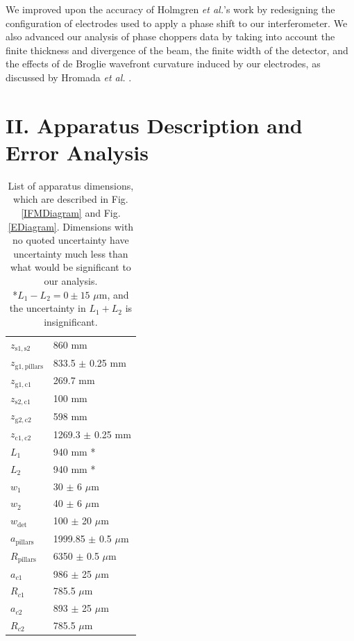 \documentclass[twocolumn,prl,showpacs,superscriptaddress]{revtex4-1}   %
\newcommand{\figref}[1]{Fig. \ref{#1}}
\newcommand{\etal}{\textit{et al.}}
\newcommand{\etalspace}{\textit{et al. }}
\begin{document}
We improved upon the accuracy of Holmgren \etal's work by redesigning the configuration of electrodes used to apply a phase shift to our interferometer. We also advanced our analysis of phase choppers data by taking into account the finite thickness and divergence of the beam, the finite width of the detector, and the effects of de Broglie wavefront curvature induced by our electrodes, as discussed by Hromada \etalspace \cite{Hromada2014}.


\section{II. Apparatus Description and Error Analysis}

\begingroup
\begin{table}
\caption{\label{tableDimensions}List of apparatus dimensions, which are described in \figref{IFMDiagram} and \figref{EDiagram}. Dimensions with no quoted uncertainty have uncertainty much less than what would be significant to our analysis.\\\hspace{\textwidth}
*$L_1-L_2 = 0 \pm 15$ $\mu$m, and the uncertainty in $L_1 + L_2$ is insignificant.}
\begin{center}
\begin{tabular}{l l}
\hline\hline
$z_{\mathrm{s1,s2}}$ & 860 mm \\
$z_{\mathrm{g1,pillars}}$ & 833.5 $\pm$ 0.25 mm \\
$z_{\mathrm{g1,c1}}$ & 269.7 mm \\
$z_{\mathrm{s2,c1}}$ & 100 mm \\
$z_{\mathrm{g2,c2}}$ & 598 mm \\
$z_{\mathrm{c1,c2}}$ & 1269.3 $\pm$ 0.25 mm \\
$L_1$ & 940 mm * \\
$L_2$ & 940 mm * \\
$w_1$ & 30 $\pm$ 6 $\mu$m \\
$w_2$ & 40 $\pm$ 6 $\mu$m \\
$w_{\mathrm{det}}$ & 100 $\pm$ 20 $\mu$m \\ 
$a_{\mathrm{pillars}}$ & 1999.85 $\pm$ 0.5 $\mu$m \\
$R_{\mathrm{pillars}}$ & 6350 $\pm$ 0.5 $\mu$m \\
$a_{c1}$ & 986 $\pm$ 25 $\mu$m \\
$R_{c1}$ & 785.5 $\mu$m \\
$a_{c2}$ & 893 $\pm$ 25 $\mu$m \\
$R_{c2}$ & 785.5 $\mu$m \\
\hline\hline
\end{tabular}
\end{center}
\end{table}
\endgroup
\end{document}
